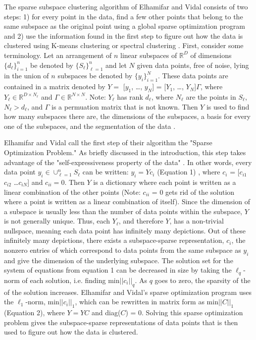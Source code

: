 \documentclass{article}
\newcommand{\R}{\mathbb{R}}
\begin{document}
\hspace{\parindent}The sparse subspace clustering algorithm of Elhamifar and Vidal consists of two steps: 1) for every point in the data, find a few other points that belong to the same subspace as the original point using a global sparse optimization program and 2) use the information found in the first step to figure out how the data is clustered using K-means clustering or spectral clustering \cite{elhamifar2012sparse}. First, consider some terminology. Let an arrangement of $n$ linear subspaces of $\R^D$ of dimensions$\{d_\ell\}_{i=1}^n$ be denoted by $\{S_\ell\}_{\ell=1}^n$ and let $N$ given data points, free of noise, lying in the union of $n$ subspaces be denoted by $\{y_i\}_{i=1}^N$. These data points are contained in a matrix denoted by $Y =$ [$y_1$, \dots, $y_N$] = [$Y_1$, \dots , $Y_N$]$\Gamma$, where $Y_\ell \in \R^{D \times N_\ell}$ and $\Gamma \in \R^{N \times N}$. Note: $Y_\ell$ has rank $d_\ell$, where $N_\ell$ are the points in $S_\ell$, $N_\ell > d_\ell$, and $\Gamma$ is a permuation matrix that is not known. Then $Y$ is used to find how many subspaces there are, the dimensions of the subspaces, a basis for every one of the subspaces, and the segmentation of the data \cite{elhamifar2012sparse}.

Elhamifar and Vidal call the first step of their algorithm the "Sparse Optimization Problem." As briefly discussed in the introduction, this step takes advantage of the "self-expressiveness property of the data" \cite{elhamifar2012sparse}. In other words, every data point $y_i \in \cup_{\ell=1}^nS_\ell$ can be written: $y_i = Yc_i$ (Equation 1) , where $c_i$ = [$c_{i1}$ $c_{i2}$ \dots $c_{iN}$] and $c_{ii} = 0$. Then $Y$ is a dictionary where each point is written as a linear combination of the other points (Note: $c_{ii}$ = 0 gets rid of the solution where a point is written as a linear combination of itself). Since the dimension of a subspace is usually less than the number of data points within the subspace, $Y$ is not generally unique. Thus, each $Y_\ell$, and therefore $Y$, has a non-trivial nullspace, meaning each data point has infinitely many depictions. Out of these infinitely many depictions, there exists a subspace-sparse representation, $c_i$, the nonzero entries of which
correspond to data points from the same subspace as $y_i$ and give the dimension of the underlying subspace. The solution set for the system of equations from equation 1 can be decreased in size by taking the $\ell_q$-norm of each solution, i.e. finding min$||c_i||_q$. As $q$ goes to zero, the sparsity of the of the solution increases. Elhamifar and Vidal's sparse optimization program uses the $\ell_1$-norm, min$||c_i||_1$, which can be rewritten in matrix form as min$||C||_1$ (Equation 2), where $Y = YC$ and diag($C$) = 0. Solving this sparse optimization problem gives the subspace-sparse representations of data points that is then used to figure out how the data is clustered. \cite{elhamifar2012sparse} 
\end{document}
